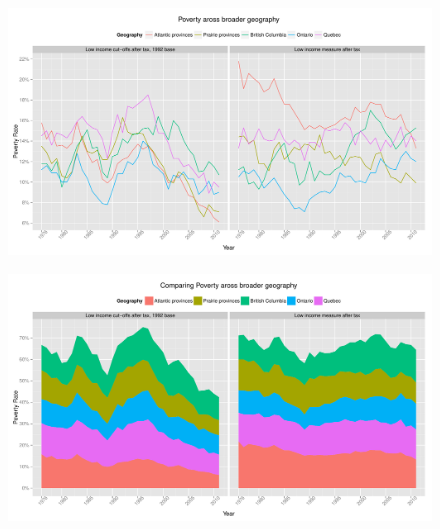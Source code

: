 \documentclass{article}\usepackage[]{graphicx}\usepackage[]{color}
\makeatletter
\def\maxwidth{ %
  \ifdim\Gin@nat@width>\linewidth
    \linewidth
  \else
    \Gin@nat@width
  \fi
}
\newenvironment{knitrout}{}{} %
\makeatother
\begin{document}
\begin{figure}[ht]
\begin{center}
\begin{knitrout}
\color{fgcolor}
\includegraphics[width=\maxwidth]{figure/unnamed-chunk-12} 

\end{knitrout}

\end{center}
\end{figure}
\begin{figure}[ht]
\begin{center}
\begin{knitrout}
\color{fgcolor}
\includegraphics[width=\maxwidth]{figure/unnamed-chunk-13} 

\end{knitrout}

\end{center}
\end{figure}
\end{document}
